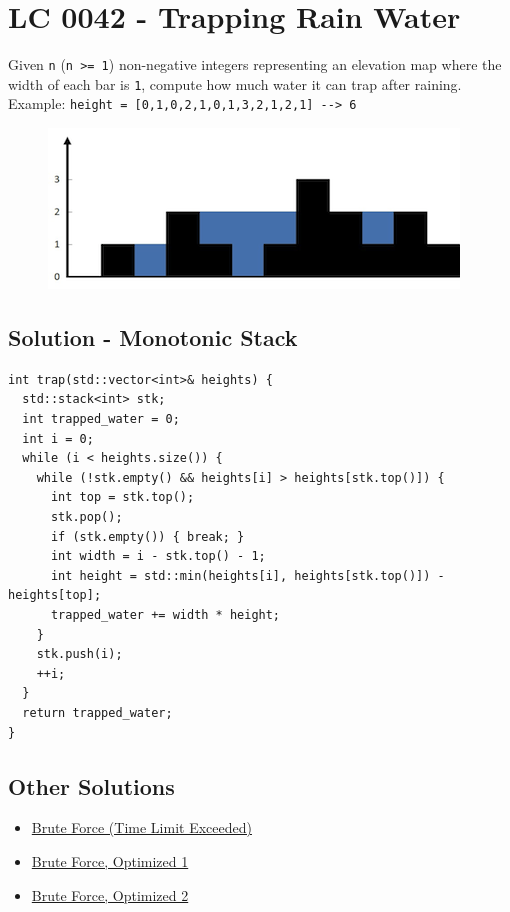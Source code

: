 \section{LC 0042 - Trapping Rain Water}
Given {\colorbox{CodeBackground}{\lstinline|n|}} ({\colorbox{CodeBackground}{\lstinline|n >= 1|}}) non-negative integers representing an elevation map where the width of each bar is {\colorbox{CodeBackground}{\lstinline|1|}}, compute how much water it can trap after raining.\\

Example: {\colorbox{CodeBackground}{\lstinline|height = [0,1,0,2,1,0,1,3,2,1,2,1] --> 6|}}
\begin{figure}[H]
\centering
\includegraphics[width=0.4\linewidth]{images/lc0042_eg}
\end{figure}

\subsection*{Solution - Monotonic Stack}\label{solution:lc0042_monotonic_stack}
\begin{lstlisting}
int trap(std::vector<int>& heights) {
  std::stack<int> stk;
  int trapped_water = 0;
  int i = 0;
  while (i < heights.size()) {
    while (!stk.empty() && heights[i] > heights[stk.top()]) {
      int top = stk.top();
      stk.pop();
      if (stk.empty()) { break; }
      int width = i - stk.top() - 1;
      int height = std::min(heights[i], heights[stk.top()]) - heights[top];
      trapped_water += width * height;
    }
    stk.push(i);
    ++i;
  }
  return trapped_water;
}
\end{lstlisting}

\subsection*{Other Solutions}
\begin{itemize}
\item \hyperref[solution:lc0042_brute_force]{Brute Force (Time Limit Exceeded)}
\item \hyperref[solution:lc0042_brute_force_optimized_1]{Brute Force, Optimized 1}
\item \hyperref[solution:lc0042_brute_force_optimized_2]{Brute Force, Optimized 2}
\end{itemize}

